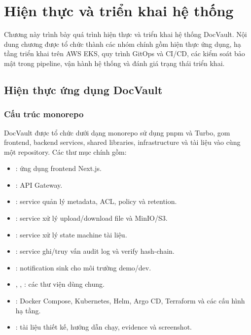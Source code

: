 \chapter{Hiện thực và triển khai hệ thống}

Chương này trình bày quá trình hiện thực và triển khai hệ thống DocVault. Nội dung chương được tổ chức thành các nhóm chính gồm hiện thực ứng dụng, hạ tầng triển khai trên AWS EKS, quy trình GitOps và CI/CD, các kiểm soát bảo mật trong pipeline, vận hành hệ thống và đánh giá trạng thái triển khai.

\section{Hiện thực ứng dụng DocVault}

\subsection{Cấu trúc monorepo}

DocVault được tổ chức dưới dạng monorepo sử dụng pnpm và Turbo, gom frontend, backend services, shared libraries, infrastructure và tài liệu vào cùng một repository. Các thư mục chính gồm:

\begin{itemize}
  \item {}: ứng dụng frontend Next.js.
  \item {}: API Gateway.
  \item {}: service quản lý metadata, ACL, policy và retention.
  \item {}: service xử lý upload/download file và MinIO/S3.
  \item {}: service xử lý state machine tài liệu.
  \item {}: service ghi/truy vấn audit log và verify hash-chain.
  \item {}: notification sink cho môi trường demo/dev.
  \item {}, , : các thư viện dùng chung.
  \item {}: Docker Compose, Kubernetes, Helm, Argo CD, Terraform và các cấu hình hạ tầng.
  \item {}: tài liệu thiết kế, hướng dẫn chạy, evidence và screenshot.
\end{itemize}

